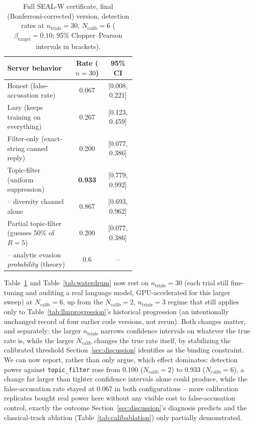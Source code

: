 \documentclass[10pt,journal,compsoc]{IEEEtran}
\begin{document}
\begin{table}[t]
\centering
\footnotesize
\caption{Full SEAL-W certificate, final (Bonferroni-corrected) version, detection rates at $n_{\text{trials}}{=}30$, $N_{\text{calib}}{=}6$ ($\beta_{\text{target}}{=}0.10$; 95\% Clopper--Pearson intervals in brackets).}
\label{tab:llmfull}
\begin{tabular}{@{}p{0.52\linewidth}cc@{}}
\toprule
Server behavior & Rate ($n{=}30$) & 95\% CI \\
\midrule
Honest (false-accusation rate) & 0.067 & [0.008, 0.221] \\
Lazy (keeps training on everything) & 0.267 & [0.123, 0.459] \\
Filter-only (exact-string canned reply) & 0.200 & [0.077, 0.386] \\
Topic-filter (uniform suppression) & \textbf{0.933} & [0.779, 0.992] \\
\quad -- diversity channel alone & 0.867 & [0.693, 0.962] \\
Partial topic-filter (guesses 50\% of $R{=}5$) & 0.200 & [0.077, 0.386] \\
\quad -- analytic evasion \emph{probability} (theory) & 0.6 & -- \\
\bottomrule
\end{tabular}
\end{table}

Table~\ref{tab:llmfull} and Table~\ref{tab:waterdrum} now rest on $n_{\text{trials}}=30$ (each trial still fine-tuning and auditing a real language model, GPU-accelerated for this larger sweep) at $N_{\text{calib}}=6$, up from the $N_{\text{calib}}=2$, $n_{\text{trials}}=3$ regime that still applies only to Table~\ref{tab:llmprogression}'s historical progression (an intentionally unchanged record of four earlier code versions, not rerun). Both changes matter, and separately: the larger $n_{\text{trials}}$ narrows confidence intervals on whatever the true rate is, while the larger $N_{\text{calib}}$ changes the true rate itself, by stabilizing the calibrated threshold Section~\ref{sec:discussion} identifies as the binding constraint. We can now report, rather than only argue, which effect dominates: detection power against \texttt{topic\_filter} rose from 0.100 ($N_{\text{calib}}=2$) to 0.933 ($N_{\text{calib}}=6$), a change far larger than tighter confidence intervals alone could produce, while the false-accusation rate stayed at 0.067 in both configurations -- more calibration replicates bought real power here without any visible cost to false-accusation control, exactly the outcome Section~\ref{sec:discussion}'s diagnosis predicts and the classical-track ablation (Table~\ref{tab:calibablation}) only partially demonstrated.
\end{document}
